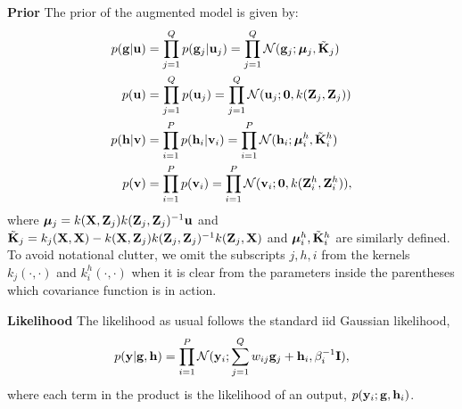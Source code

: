 \noindent
\textbf{Prior}
The prior of the augmented model is given by:
\begin{align}
p(\mathbf{g} | \mathbf{u}) &= \prod_{j=1}^Q p(\mathbf{g}_j | \mathbf{u}_j) = \prod_{j=1}^Q \mathcal{N}(\mathbf{g}_j; \boldsymbol{\mu}_j, \tilde{\mathbf{K}}_j )\\
p(\mathbf{u}) &= \prod_{j=1}^Q p(\mathbf{u}_j) = \prod_{j=1}^Q \mathcal{N}(\mathbf{u}_j; \mathbf{0}, k(\mathbf{Z}_j, \mathbf{Z}_j)) \\
p(\mathbf{h} | \mathbf{v}) &= \prod_{i=1}^P p(\mathbf{h}_i | \mathbf{v}_i) = \prod_{i=1}^P \mathcal{N}(\mathbf{h}_i; \boldsymbol{\mu}^h_i, \tilde{\mathbf{K}}^h_i)\\
p(\mathbf{v}) &= \prod_{i=1}^P p(\mathbf{v}_i) = \prod_{i=1}^P \mathcal{N}(\mathbf{v}_i; \mathbf{0}, k(\mathbf{Z}^h_i, \mathbf{Z}^h_i)),
\end{align}
where $\boldsymbol{\mu}_j = k(\mathbf{X},\mathbf{Z}_j)k(\mathbf{Z}_j,\mathbf{Z}_j)^{-1}\mathbf{u}$ and $\tilde{\mathbf{K}}_j = k_j(\mathbf{X},\mathbf{X}) - k(\mathbf{X},\mathbf{Z}_j)k(\mathbf{Z}_j,\mathbf{Z}_j)^{-1}k(\mathbf{Z}_j,\mathbf{X})$ and $\boldsymbol{\mu}^h_i, \tilde{\mathbf{K}}^h_i$ are similarly defined.
To avoid notational clutter, we omit the subscripts $j,h,i$ from the kernels $k_j(\cdot,\cdot)$ and $k^h_i(\cdot,\cdot)$ when it is clear from the parameters inside the parentheses which covariance function is in action. 

\noindent
\textbf{Likelihood}
The likelihood as usual follows the standard iid Gaussian likelihood,
\begin{align}
p(\mathbf{y} | \mathbf{g}, \mathbf{h} ) = \prod_{i=1}^P \mathcal{N}( \mathbf{y}_i ; \sum_{j=1}^Q w_{ij} \mathbf{g}_j + \mathbf{h}_i, \beta_i^{-1} \mathbf{I}),
\end{align}
where each term in the product is the likelihood of an output, $p( \mathbf{y}_i ; \mathbf{g}, \mathbf{h}_i)$.
